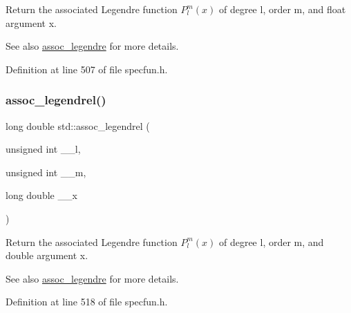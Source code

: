 Return the associated Legendre function $ P_l^m(x) $ of degree {\ttfamily l}, order {\ttfamily m}, and {\ttfamily float} argument {\ttfamily x}.

\begin{DoxySeeAlso}{See also}
\hyperlink{group__mathsf__std_ga7aa4182446f687094b12688078517d53}{assoc\+\_\+legendre} for more details. 
\end{DoxySeeAlso}


Definition at line 507 of file specfun.\+h.

\mbox{\label{group__mathsf__std_ga55977b425a539146f060dec1c8003344}} 
\subsubsection{\texorpdfstring{assoc\+\_\+legendrel()}{assoc\_legendrel()}}
{\footnotesize\ttfamily long double std\+::assoc\+\_\+legendrel (\begin{DoxyParamCaption}\item[{unsigned int}]{\+\_\+\+\_\+l,  }\item[{unsigned int}]{\+\_\+\+\_\+m,  }\item[{long double}]{\+\_\+\+\_\+x }\end{DoxyParamCaption})\hspace{0.3cm}{\ttfamily [inline]}}

Return the associated Legendre function $ P_l^m(x) $ of degree {\ttfamily l}, order {\ttfamily m}, and { double} argument {\ttfamily x}.

\begin{DoxySeeAlso}{See also}
\hyperlink{group__mathsf__std_ga7aa4182446f687094b12688078517d53}{assoc\+\_\+legendre} for more details. 
\end{DoxySeeAlso}


Definition at line 518 of file specfun.\+h.

\mbox{\label{group__mathsf__std_gacd36403ae64b89840b1504f97024dcee}} 
